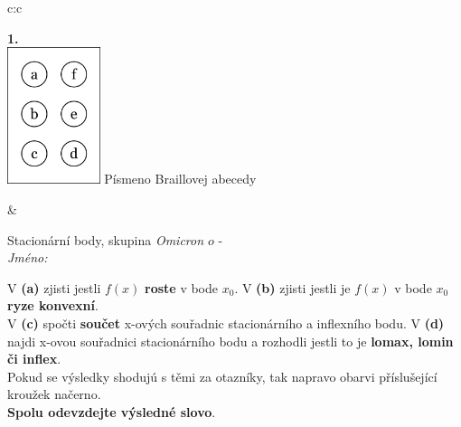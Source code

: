 \documentclass[10pt]{report}
\newcommand\omicron{o}
\begin{document}
\begin{tabular}{c:c}
\begin{minipage}[c][104.5mm][t]{0.5\linewidth}
\begin{center}
\begin{minipage}{0.79\linewidth}
\end{minipage}
\begin{minipage}{0.20\linewidth}
\begin{center}
{\Huge\bfseries 1.} \\[2mm]
\includegraphics[height=40mm]{../images/braille.png}
{\small Písmeno Braillovej abecedy}
\end{center}
\end{minipage}
\end{center}
\end{minipage}
&
\begin{minipage}[c][104.5mm][t]{0.5\linewidth}
\begin{center}
\vspace{7mm}
{\huge Stacionární body, skupina \textit{Omicron $\omicron$} -}\\[5mm]
\textit{Jméno:}\phantom{xxxxxxxxxxxxxxxxxxxxxxxxxxxxxxxxxxxxxxxxxxxxxxxxxxxxxxxxxxxxxxxxx}\\[5mm]
\begin{minipage}{0.95\linewidth}
\begin{center}
{\small V \textbf{(a)} zjisti jestli $f(x)$ \textbf{roste} v bode $x_0$. V \textbf{(b)} zjisti jestli je $f(x)$ v bode $x_0$ \textbf{ryze konvexní}.\\V \textbf{(c)} spočti \textbf{součet} x-ových souřadnic stacionárního a inflexního bodu. V \textbf{(d)} najdi x-ovou souřadnici stacionárního bodu a rozhodli jestli to je \textbf{lomax, lomin či inflex}.\\Pokud se výsledky shodujú s těmi za otazníky, tak napravo obarvi příslušející kroužek načerno.\\\textbf{Spolu odevzdejte výsledné slovo}}.
\end{center}
\end{minipage}
\\[1mm]
\begin{minipage}{0.79\linewidth}
\begin{center}
\begin{varwidth}{\linewidth}
\begin{enumerate}
\normalsize

\end{enumerate}
\end{varwidth}
\end{center}
\end{minipage}
\end{center}
\end{minipage}
\end{tabular}
\end{document}
